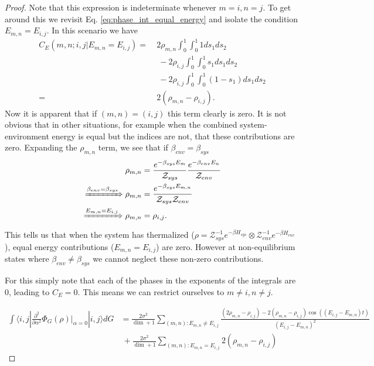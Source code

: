 \documentclass{article}
\newcommand{\ket}[1]{|#1\rangle}
\newcommand{\bra}[1]{\langle #1|}
\newcommand{\partfun}{\mathcal{Z}}
\begin{document}
\begin{proof}
Note that this expression is indeterminate whenever $m = i, n = j$. To get around this we revisit Eq. \eqref{eq:phase_int_equal_energy} and isolate the condition $E_{m,n} = E_{i,j}$. In this scenario we have
\begin{align}
    C_E(m,n;i,j | E_{m,n} = E_{i,j}) =&~ 2 \rho_{m,n} \int_0^1 \int_0^1 1 ds_1 ds_2 \nonumber \\
    &~ ~ - 2 \rho_{i,j} \int_0^1 \int_0^1 s_1 ds_1 ds_2 \nonumber \\
    &~ ~ - 2 \rho_{i,j} \int_0^1 \int_0^1 (1-s_1) ds_1 ds_2 \\
    =&~ 2 (\rho_{m,n} - \rho_{i,j}).
\end{align}
Now it is apparent that if $(m,n) = (i,j)$ this term clearly is zero. It is not obvious that in other situations, for example when the combined system-environment energy is equal but the indices are not, that these contributions are zero. Expanding the $\rho_{m,n}$ term, we see that if $\beta_{env} = \beta_{sys}$
\begin{align}
    \rho_{m,n} &= \frac{e^{-\beta_{sys} E_m}}{\partfun_{sys}} \frac{e^{-\beta_{env} E_{n}}}{\partfun_{env}} \\
    \xRightarrow{\beta_{env} = \beta_{sys}} \rho_{m,n} &= \frac{e^{-\beta_{sys}E_{m,n}}}{\partfun_{sys} \partfun_{env}} \\
    \xRightarrow{E_{m,n} = E_{i,j}} \rho_{m,n} &= \rho_{i,j}.
\end{align}
This tells us that when the system has thermalized ($\rho = \partfun_{sys}^{-1} e^{-\beta H_{sys}} \otimes \partfun_{env}^{-1} e^{-\beta H_{env}}$), equal energy contributions ($E_{m,n} = E_{i,j}$) are zero. However at non-equilibrium states where $\beta_{env} \neq \beta_{sys}$ we cannot neglect these non-zero contributions. 

For this simply note that each of the phases in the exponents of the integrals are 0, leading to $C_E = 0$. This means we can restrict ourselves to $m \neq i, n \neq j$. 

\begin{align}
    \int \bra{i,j} \frac{\partial^2}{\partial \alpha^2} \Phi_G(\rho) \bigg|_{\alpha = 0} \ket{i,j} dG &= \frac{2 \sigma^2}{\dim + 1} \sum_{(m,n) : E_{m,n} \neq E_{i,j}} \frac{(2 \rho_{m,n} - \rho_{i,j}) - 2(\rho_{m,n} - \rho_{i,j}) \cos ((E_{i,j} - E_{m,n})t)}{(E_{i,j} - E_{m,n})^2} \nonumber \\
    &~ + \frac{2 \sigma^2}{\dim + 1} \sum_{(m,n) : E_{m,n} = E_{i,j}} 2 (\rho_{m,n} - \rho_{i,j}) \label{eq:second_order_final}
\end{align}
\end{proof}
\end{document}
